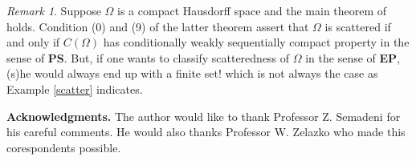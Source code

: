 \documentclass[11pt,bezier,epsf]{amsart}
\theoremstyle{definition}
\theoremstyle{remark}
\newtheorem{rem}[thm]{Remark}
\numberwithin{equation}{section}
\begin{document}
\begin{rem}
Suppose $\varOmega$ is a compact Hausdorff space and the main theorem of
\cite[p.214]{Semadeni} holds. Condition (0) and (9) of the latter theorem assert
that $\varOmega$ is scattered if and only if $C(\varOmega)$ has
 conditionally weakly sequentially compact property in the sense of {\bf PS}. But, if one wants to classify scatteredness of $\varOmega$ in the sense of {\bf EP}, (s)he would always end up with a finite set! which is not always the case as Example \ref{scatter} indicates.
\end{rem}

{\bf Acknowledgments.} The author would like to thank Professor Z. Semadeni for his careful comments. He would also thanks Professor W. Zelazko who made this corespondents possible. 



\end{document}
